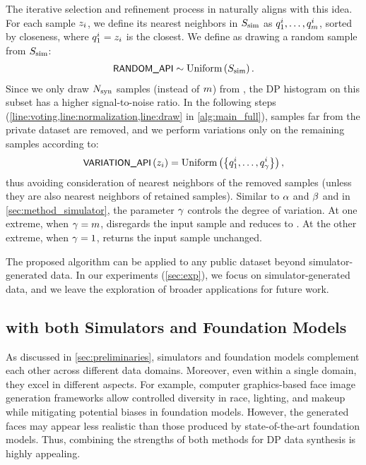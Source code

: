 The iterative selection and refinement process in \pe{} naturally aligns with this idea. For each sample $z_i$, we define its nearest neighbors in $S_{\text{sim}}$ as $q^i_1,\ldots,q^i_m$, sorted by closeness, where $q^i_1 = z_i$ is the closest.
We define \randomsampleapiname{} as drawing a random sample from $S_{\text{sim}}$:
\begin{align*}
\randomsampleapiname{} \sim \uniform{\simdataset}.
\end{align*}
Since we only draw $N_{\mathrm{syn}}$ samples (instead of $m$) from \randomsampleapiname{}, the DP histogram on this subset has a higher signal-to-noise ratio.
In the following steps (\cref{line:voting,line:normalization,line:draw} in \cref{alg:main_full}), samples far from the private dataset are removed, and we perform variations only on the remaining samples according to:
\begin{align*}
\samplevariationapi{\simdata_i} = \uniform{\brc{\nnsample^i_1,\ldots,\nnsample^i_\nnvariationdegree}},
\end{align*}
thus avoiding consideration of nearest neighbors of the removed samples (unless they are also nearest neighbors of retained samples).
Similar to $\alpha$ and $\beta$ and in \cref{sec:method_simulator}, the parameter $\gamma$ controls the degree of variation. At one extreme, when $\gamma = m$, \samplevariationapiname{} disregards the input sample and reduces to \randomsampleapiname{}. At the other extreme, when $\gamma = 1$, \samplevariationapiname{} returns the input sample unchanged.

The proposed algorithm can be applied to any public dataset beyond simulator-generated data. In our experiments (\cref{sec:exp}), we focus on simulator-generated data, and we leave the exploration of broader applications for future work.

\subsection{\simpe{} with both Simulators and Foundation Models}
\label{sec:method_simulator_and_model}

As discussed in \cref{sec:preliminaries}, simulators and foundation models complement each other across different data domains. Moreover, even within a single domain, they excel in different aspects. For example, computer graphics-based face image generation frameworks \cite{bae2023digiface,wood2021fake} allow controlled diversity in race, lighting, and makeup while mitigating potential biases in foundation models. However, the generated faces may appear less realistic than those produced by state-of-the-art foundation models. Thus, combining the strengths of both methods for DP data synthesis is highly appealing. 

